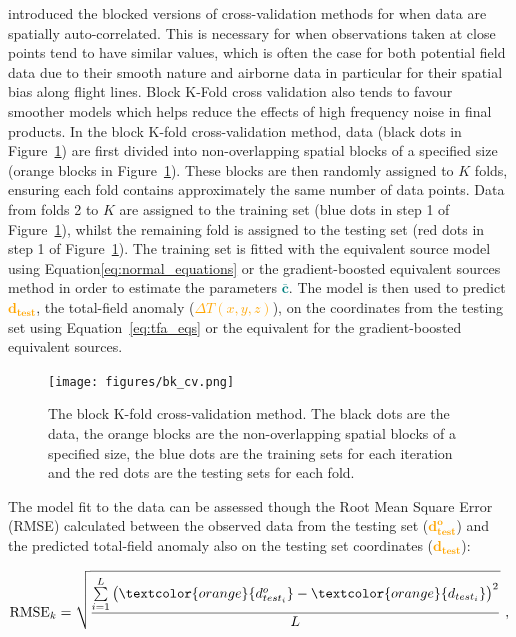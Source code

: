 \citet{Roberts2017} introduced the blocked versions of cross-validation methods for when data are spatially auto-correlated. This is necessary for when observations taken at close points tend to have similar values, which is often the case for both potential field data due to their smooth nature and airborne data in particular for their spatial bias along flight lines. Block K-Fold cross validation also tends to favour smoother models which helps reduce the effects of high frequency noise in final products. In the block K-fold cross-validation method, data (black dots in Figure~\ref{fig:BK-CV}) are first divided into non-overlapping spatial blocks of a specified size (orange blocks in Figure~\ref{fig:BK-CV}). These blocks are then randomly assigned to $K$ folds, ensuring each fold contains approximately the same number of data points. Data from folds 2 to $K$ are assigned to the training set (blue dots in step 1 of Figure~\ref{fig:BK-CV}), whilst the remaining fold is assigned to the testing set (red dots in step 1 of Figure~\ref{fig:BK-CV}). The training set is fitted with the equivalent source model using Equation\ref{eq:normal_equations} or the gradient-boosted equivalent sources method in order to estimate the parameters \textcolor{teal}{$\bar{\mathbf{c}}$}. The model is then used to predict \textcolor{orange}{$\mathbf{d_{test}}$}, the total-field anomaly (\textcolor{orange}{$\Delta T (x, y, z)$}), on the coordinates from the testing set using Equation~\ref{eq:tfa_eqs} or the equivalent for the gradient-boosted equivalent sources.

\begin{figure}[tb]
  \centering
  \texttt{[image: figures/bk\_cv.png]}
  \caption{
    The block K-fold cross-validation method. The black dots are the data, the orange blocks are the non-overlapping spatial blocks of a specified size, the blue dots are the training sets for each iteration and the red dots are the testing sets for each fold.
    }
  \label{fig:BK-CV}
\end{figure}

The model fit to the data can be assessed though the Root Mean Square Error (RMSE) calculated between the observed data from the testing set (\textcolor{orange}{$\mathbf{d^o_{test}}$}) and the predicted total-field anomaly also on the testing set coordinates (\textcolor{orange}{$\mathbf{d_{test}}$}):

\begin{equation}
    \label{eq:rmse}
    \text{RMSE}_k = \sqrt{\dfrac{\sum\limits_{i=1}^L \left(\textcolor{orange}{{d^o_{test_i}}} - \textcolor{orange}{{d_{test_i}}}\right)^2}{L}}
    \ ,
\end{equation}

